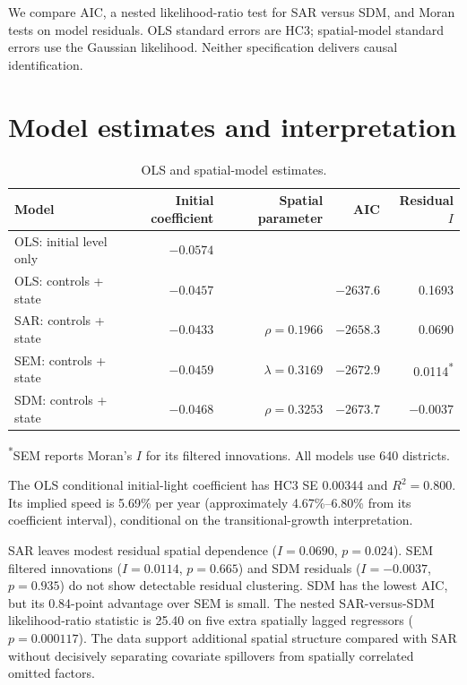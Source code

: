 \documentclass[11pt]{article}
\newcommand{\Rtwo}{\ensuremath{R^{2}}}
\newcommand{\NA}{\textemdash}
\newcommand{\reportsection}[1]{\Needspace{8\baselineskip}\section{#1}}
\begin{document}
We compare AIC, a nested likelihood-ratio test for SAR versus SDM, and Moran
tests on model residuals. OLS standard errors are HC3; spatial-model standard
errors use the Gaussian likelihood. Neither specification delivers causal
identification.

\reportsection{Model estimates and interpretation}

\begin{table}[H]
  \centering
  \caption{OLS and spatial-model estimates.}
  \small
  \begin{tabularx}{\textwidth}{@{}Yrrrr@{}}
    \toprule
    \textbf{Model} & \textbf{Initial coefficient} & \textbf{Spatial parameter} &
    \textbf{AIC} & \textbf{Residual $I$} \\
    \midrule
    OLS: initial level only & $-0.0574$ & \NA & \NA & \NA \\
    OLS: controls + state & $-0.0457$ & \NA & $-2637.6$ & 0.1693 \\
    SAR: controls + state & $-0.0433$ & $\rho=0.1966$ & $-2658.3$ & 0.0690 \\
    SEM: controls + state & $-0.0459$ & $\lambda=0.3169$ & $-2672.9$ & 0.0114\textsuperscript{*} \\
    SDM: controls + state & $-0.0468$ & $\rho=0.3253$ & $-2673.7$ & $-0.0037$ \\
    \bottomrule
  \end{tabularx}
  \vspace{0.35em}

  \parbox{\textwidth}{\footnotesize
  \textsuperscript{*}SEM reports Moran's $I$ for its filtered innovations.
  All models use 640 districts.}
\end{table}

The OLS conditional initial-light coefficient has HC3 SE 0.00344 and
$\Rtwo=0.800$. Its implied speed is 5.69\% per year (approximately
4.67\%--6.80\% from its coefficient interval), conditional on the
transitional-growth interpretation.

SAR leaves modest residual spatial dependence ($I=0.0690$, $p=0.024$). SEM
filtered innovations ($I=0.0114$, $p=0.665$) and SDM residuals
($I=-0.0037$, $p=0.935$) do not show detectable residual clustering. SDM has
the lowest AIC, but its 0.84-point advantage over SEM is small. The nested
SAR-versus-SDM likelihood-ratio statistic is 25.40 on five extra spatially
lagged regressors ($p=0.000117$). The data support additional spatial
structure compared with SAR without decisively separating covariate
spillovers from spatially correlated omitted factors.
\end{document}
